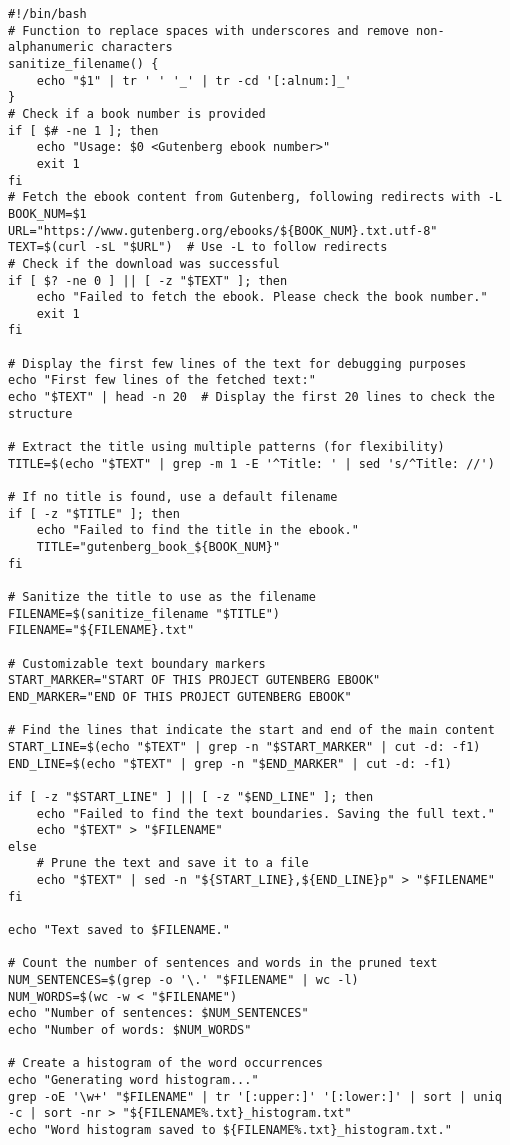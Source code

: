 \documentclass[a4paper, 12pt]{article}
\begin{document}
\begin{lstlisting}
#!/bin/bash
# Function to replace spaces with underscores and remove non-alphanumeric characters
sanitize_filename() {
    echo "$1" | tr ' ' '_' | tr -cd '[:alnum:]_'
}
# Check if a book number is provided
if [ $# -ne 1 ]; then
    echo "Usage: $0 <Gutenberg ebook number>"
    exit 1
fi
# Fetch the ebook content from Gutenberg, following redirects with -L
BOOK_NUM=$1
URL="https://www.gutenberg.org/ebooks/${BOOK_NUM}.txt.utf-8"
TEXT=$(curl -sL "$URL")  # Use -L to follow redirects
# Check if the download was successful
if [ $? -ne 0 ] || [ -z "$TEXT" ]; then
    echo "Failed to fetch the ebook. Please check the book number."
    exit 1
fi

# Display the first few lines of the text for debugging purposes
echo "First few lines of the fetched text:"
echo "$TEXT" | head -n 20  # Display the first 20 lines to check the structure

# Extract the title using multiple patterns (for flexibility)
TITLE=$(echo "$TEXT" | grep -m 1 -E '^Title: ' | sed 's/^Title: //')

# If no title is found, use a default filename
if [ -z "$TITLE" ]; then
    echo "Failed to find the title in the ebook."
    TITLE="gutenberg_book_${BOOK_NUM}"
fi

# Sanitize the title to use as the filename
FILENAME=$(sanitize_filename "$TITLE")
FILENAME="${FILENAME}.txt"

# Customizable text boundary markers
START_MARKER="START OF THIS PROJECT GUTENBERG EBOOK"
END_MARKER="END OF THIS PROJECT GUTENBERG EBOOK"

# Find the lines that indicate the start and end of the main content
START_LINE=$(echo "$TEXT" | grep -n "$START_MARKER" | cut -d: -f1)
END_LINE=$(echo "$TEXT" | grep -n "$END_MARKER" | cut -d: -f1)

if [ -z "$START_LINE" ] || [ -z "$END_LINE" ]; then
    echo "Failed to find the text boundaries. Saving the full text."
    echo "$TEXT" > "$FILENAME"
else
    # Prune the text and save it to a file
    echo "$TEXT" | sed -n "${START_LINE},${END_LINE}p" > "$FILENAME"
fi

echo "Text saved to $FILENAME."

# Count the number of sentences and words in the pruned text
NUM_SENTENCES=$(grep -o '\.' "$FILENAME" | wc -l)
NUM_WORDS=$(wc -w < "$FILENAME")
echo "Number of sentences: $NUM_SENTENCES"
echo "Number of words: $NUM_WORDS"

# Create a histogram of the word occurrences
echo "Generating word histogram..."
grep -oE '\w+' "$FILENAME" | tr '[:upper:]' '[:lower:]' | sort | uniq -c | sort -nr > "${FILENAME%.txt}_histogram.txt"
echo "Word histogram saved to ${FILENAME%.txt}_histogram.txt."
\end{lstlisting}
\end{document}

